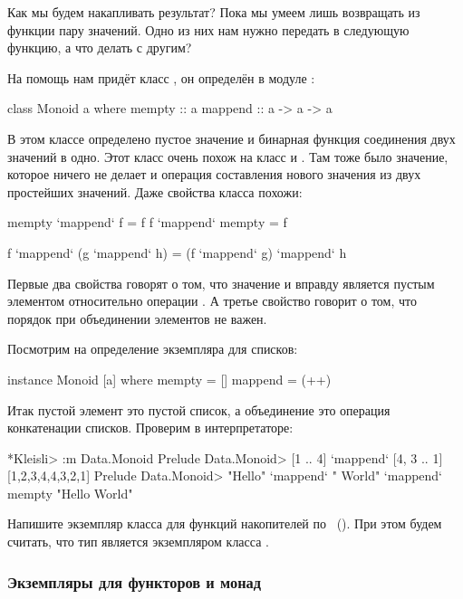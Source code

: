 Как мы будем накапливать результат? Пока мы умеем лишь возвращать из
функции пару значений. Одно из них нам нужно передать в следующую
функцию, а что делать с другим?

На помощь нам придёт класс  , он
определён в модуле :


\begin{code}
class Monoid a where
    mempty  :: a
    mappend :: a -> a -> a
\end{code}

В этом классе определено пустое значение  и бинарная функция
соединения двух значений в одно. Этот класс очень похож на класс
 и . Там тоже было значение, которое ничего не
делает и операция составления нового значения из двух простейших
значений. Даже свойства класса похожи:


\begin{code}
mempty  `mappend` f         = f
f       `mappend` mempty    = f

f `mappend` (g `mappend` h) =  (f `mappend` g) `mappend` h 
\end{code}


Первые два свойства говорят о том, что значение  и вправду
является пустым элементом относительно операции . А третье
свойство говорит о том, что порядок при объединении элементов не важен.

Посмотрим на определение экземпляра для списков:


\begin{code}
instance Monoid [a] where
    mempty  = []
    mappend = (++)
\end{code}

Итак пустой элемент это пустой список, а объединение это операция
конкатенации списков. Проверим в интерпретаторе:


\begin{code}
*Kleisli> :m Data.Monoid
Prelude Data.Monoid> [1 .. 4] `mappend` [4, 3 .. 1]
[1,2,3,4,4,3,2,1]
Prelude Data.Monoid> "Hello" `mappend` " World" `mappend` mempty
"Hello World"
\end{code}

Напишите экземпляр класса  для функций накопителей по
~(). При этом будем считать, что тип  является
экземпляром класса .

\subsubsection{Экземпляры для функторов и монад}

